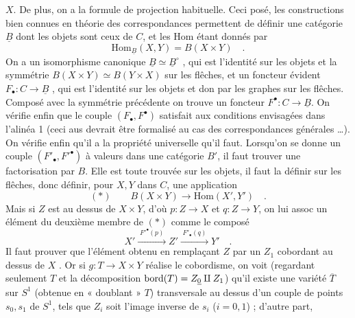 \documentclass[11pt,a4paper]{article}
\begin{document}
$X$. De plus, on a la formule  de projection habituelle. Ceci posé, les constructions bien connues en
théorie des correspondances permettent de définir une catégorie
$\underline{B}$ dont les objets sont ceux de $C$, et les $\mathrm{Hom}$ étant
donnés par
\[
\mathrm{Hom}_{\underline{B}}(X, Y) = B(X \times Y) \quad .
\]
On a un isomorphisme canonique $\underline{B} \simeq \underline{B}^{\circ}$ ,
qui est l'identité sur les objets et la symmétrie
$B(X \times Y) \simeq B(Y \times X)$ sur les flêches, et un foncteur évident
$F_{\bullet} : C \to \underline{B}$ , qui est l'identité sur les objets et
don par les graphes sur les flêches. Composé avec la symmétrie
précédente on trouve un foncteur $F^{\bullet} : C \to \underline{B}$. On
vérifie enfin que le couple $(F_{\bullet}, F^{\bullet})$ satisfait aux
conditions envisagées dans l'alinéa 1 (ceci aus devrait être formalisé
au cas des correspondances générales …). On vérifie enfin qu'il a la
propriété universelle qu'il faut. Lorsqu'on se donne un couple
$(F'_{\bullet}, F'^{\bullet})$ à valeurs dans une catégorie $B'$, il faut trouver une
factorisation par $B$. Elle est toute trouvée sur les objets, il faut la
définir sur les flêches, donc définir, pour $X, Y$ dans $C$, une application
\[
(*) \qquad B(X \times Y) \to \mathrm{Hom}(X', Y') \quad .
\]
Mais si $Z$ est au dessus de $X \times Y$, d'où $p : Z \to X$ et
$q : Z \to Y$, on lui assoc un élément du deuxième membre de $(*)$
comme le composé
\[
X' \xrightarrow{\;F'^{\bullet}(p)\;} Z' \xrightarrow{\;F'_{\bullet}(q)\;} Y'
\quad .
\]
Il faut prouver que l'élément obtenu en remplaçant $Z$
 par un $Z_{1}$ cobordant au dessus de $X$ . Or si $g : T \to X \times Y$ réalise le cobordisme, on voit (regardant
seulement $T$ et la décomposition $\mathrm{bord}(T) = Z_{\uncertain{0}} \amalg Z_{1}$) qu'il
existe une variété $\overline{T}$ sur $S^{1}$ (obtenue en « doublant » $T$)
transversale au dessus d'un couple de points $s_{0}, s_{1}$ de $S^{1}$, tels
que $Z_{i}$ soit l'image inverse  de $s_{i}$
($i = 0, 1$) ; d'autre part,
\end{document}
